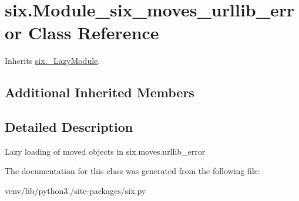 \hypertarget{classsix_1_1_module__six__moves__urllib__error}{}\section{six.\+Module\+\_\+six\+\_\+moves\+\_\+urllib\+\_\+error Class Reference}
\label{classsix_1_1_module__six__moves__urllib__error}


Inherits \hyperlink{classsix_1_1___lazy_module}{six.\+\_\+\+Lazy\+Module}.

\subsection*{Additional Inherited Members}


\subsection{Detailed Description}
\begin{DoxyVerb}Lazy loading of moved objects in six.moves.urllib_error\end{DoxyVerb}
 

The documentation for this class was generated from the following file\+:\begin{DoxyCompactItemize}
\item 
venv/lib/python3./site-\/packages/six.\+py\end{DoxyCompactItemize}
